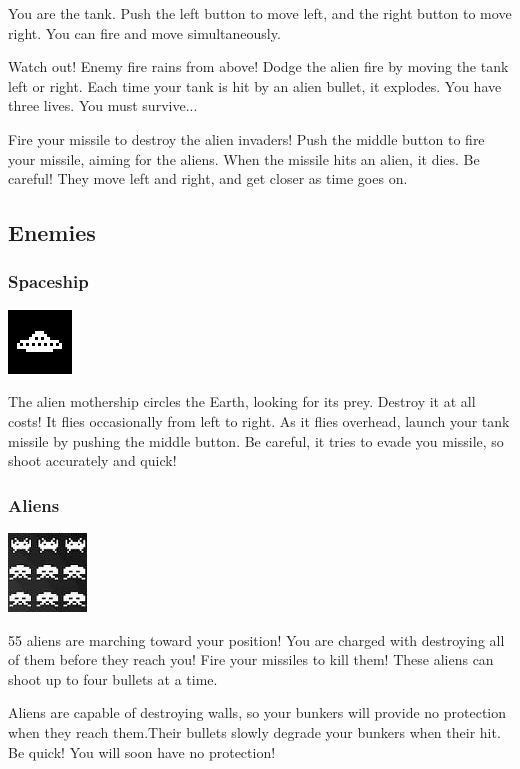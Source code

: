 \documentclass[11pt,letter,oneside]{report}
\begin{document}
You are the tank. Push the left button to move left, and the right button to move right. You can fire and move simultaneously.

Watch out! Enemy fire rains from above! Dodge the alien fire by moving the tank left or right. Each time your tank is hit by an alien bullet, it explodes. You have three lives.  You must survive...

Fire your missile to destroy the alien invaders! Push the middle button to fire your missile, aiming for the aliens. When the missile hits an alien, it dies. Be careful! They move left and right, and get closer as time goes on.

\subsection{Enemies}

\subsubsection{Spaceship}
\includegraphics[]{big-alien.png}

The alien mothership circles the Earth, looking for its prey. Destroy it at all costs! It flies occasionally from left to right. As it flies overhead, launch your tank missile by pushing the middle button. Be careful, it tries to evade you missile, so shoot accurately and quick!


\subsubsection{Aliens}
\includegraphics[]{aliens.jpg}

55 aliens are marching toward your position! You are charged with destroying all of them before they reach you! Fire your missiles to kill them! These aliens can shoot up to four bullets at a time. 

Aliens are capable of destroying walls, so your bunkers will provide no protection when they reach them.Their bullets slowly degrade your bunkers when their hit. Be quick! You will soon have no protection!
\end{document}
